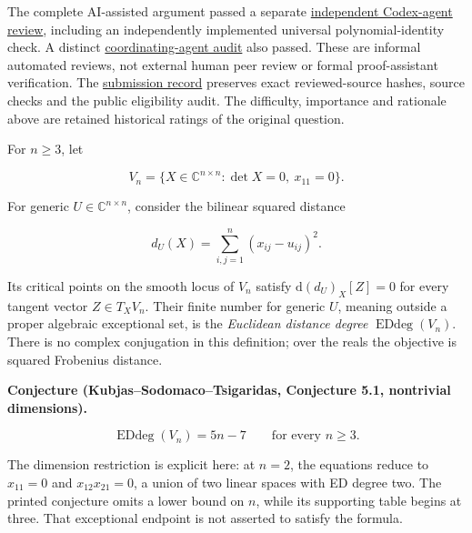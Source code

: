 \documentclass[11pt,a4paper]{article}
\makeatletter
\renewcommand{\subsection}{\Needspace{4\baselineskip}\@startsection{subsection}{2}{0pt}{9pt plus 1pt minus 1pt}{3pt}{\sffamily\bfseries\normalsize\color{ink}}}
\makeatother
\begin{document}
The complete AI-assisted argument passed a separate
\href{https://github.com/ajt60gaibb/OpenProblemsInNLA/blob/main/references/stepaniants-ra19-2026-09-11/verification/independent-review/review.md}{independent
Codex-agent review}, including an independently implemented universal
polynomial-identity check. A distinct
\href{https://github.com/ajt60gaibb/OpenProblemsInNLA/blob/main/references/stepaniants-ra19-2026-09-11/verification/RA-19-root-math-review.md}{coordinating-agent
audit} also passed. These are informal automated reviews, not external
human peer review or formal proof-assistant verification. The
\href{https://github.com/ajt60gaibb/OpenProblemsInNLA/blob/main/references/stepaniants-ra19-2026-09-11/README.md}{submission
record} preserves exact reviewed-source hashes, source checks and the
public eligibility audit. The difficulty, importance and rationale above
are retained historical ratings of the original question.

\newpage
\subsection{Statement}\label{statement}

For \(n\ge3\), let

\[V_n=\{X\in\mathbb C^{n\times n}:\det X=0,\ x_{11}=0\}.\]

For generic \(U\in\mathbb C^{n\times n}\), consider the bilinear squared
distance

\[d_U(X)=\sum_{i,j=1}^n(x_{ij}-u_{ij})^2.\]

Its critical points on the smooth locus of \(V_n\) satisfy
\(\mathrm d(d_U)_X[Z]=0\) for every tangent vector \(Z\in T_XV_n\).
Their finite number for generic \(U\), meaning outside a proper
algebraic exceptional set, is the \emph{Euclidean distance degree}
\(\operatorname{EDdeg}(V_n)\). There is no complex conjugation in this
definition; over the reals the objective is squared Frobenius distance.

\textbf{Conjecture (Kubjas--Sodomaco--Tsigaridas, Conjecture 5.1,
nontrivial dimensions).}

\[\operatorname{EDdeg}(V_n)=5n-7\qquad\text{for every }n\ge3.\]

The dimension restriction is explicit here: at \(n=2\), the equations
reduce to \(x_{11}=0\) and \(x_{12}x_{21}=0\), a union of two linear
spaces with ED degree two. The printed conjecture omits a lower bound on
\(n\), while its supporting table begins at three. That exceptional
endpoint is not asserted to satisfy the formula.
\end{document}
